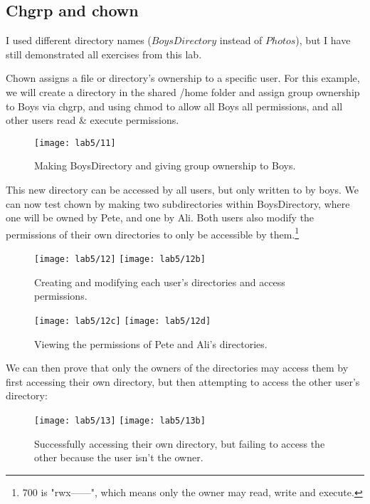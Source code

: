 \subsection{Chgrp and chown}\label{subsec:using-chown}
\begin{tcolorbox}[colback=orange!5!white,colframe=orange!75!black,title=Note]
    I used different directory names ($BoysDirectory$ instead of $Photos$),
    but I have still demonstrated all exercises from this lab.
\end{tcolorbox}
Chown assigns a file or directory's ownership to a specific user.
For this example, we will create a directory in the shared /home folder and assign group ownership
to Boys via chgrp, and using chmod to allow all Boys all permissions, and all other users
read \& execute permissions.

\begin{figure}[H]
    \centering
    \texttt{[image: lab5/11]}
    \caption{Making BoysDirectory and giving group ownership to Boys.}
    \label{fig:BoysDirectory}
\end{figure}

This new directory can be accessed by all users, but only written to by boys.
We can now test chown by making two subdirectories within BoysDirectory, where one will be owned
by Pete, and one by Ali.
Both users also modify the permissions of their own directories to only be accessible
by them.\footnote{700 is "rwx------", which means only the owner may read,
write and execute.}

\begin{figure}[H]
    \centering
    \texttt{[image: lab5/12]}
    \texttt{[image: lab5/12b]}
    \caption{Creating and modifying each user's directories and access permissions.}
    \label{fig:PeteAliDir}
\end{figure}

\begin{figure}[H]
    \centering
    \texttt{[image: lab5/12c]}
    \texttt{[image: lab5/12d]}
    \caption{Viewing the permissions of Pete and Ali's directories.}
    \label{fig:AliDirPerms}
\end{figure}

We can then prove that only the owners of the directories may access them by first accessing their
own directory, but then attempting to access the other user's directory:

\begin{figure}[H]
    \centering
    \texttt{[image: lab5/13]}
    \texttt{[image: lab5/13b]}
    \caption{Successfully accessing their own directory,
        but failing to access the other because the user isn't the owner.}
    \label{fig:PeteAliDirFail}
\end{figure}

